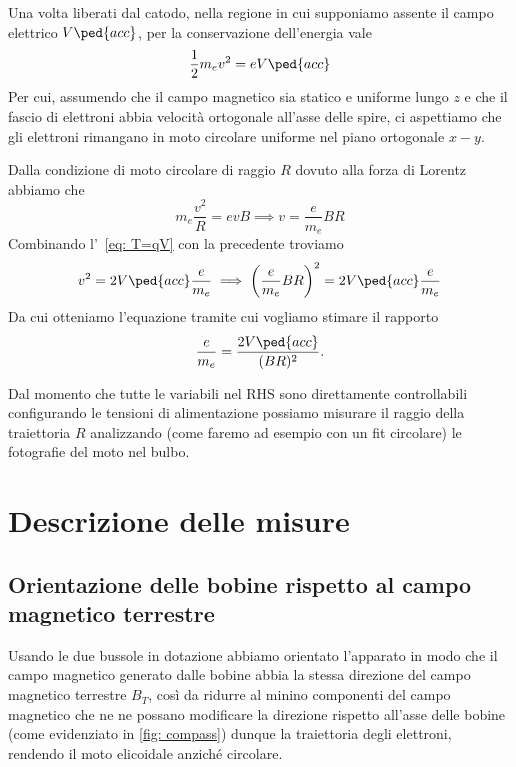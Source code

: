 \documentclass[10pt, a4paper, italian]{article}
\begin{document}
Una volta liberati dal catodo, nella regione in cui supponiamo assente il
campo elettrico $V\ped{acc}$, per la conservazione dell'energia vale
\begin{equation}\label{eq: T=qV}
    \frac{1}{2} m_{e} v^{2} = e V\ped{acc}
\end{equation}
Per cui, assumendo che il campo magnetico sia statico e uniforme lungo $z$ e
che il fascio di elettroni abbia velocità ortogonale all'asse delle spire,
ci aspettiamo che gli elettroni rimangano in moto circolare uniforme nel
piano ortogonale $x-y$.

Dalla condizione di moto circolare di raggio $R$ dovuto alla forza di Lorentz
abbiamo che
\[
m_{e} \frac{v^2}{R} = e v B \implies v = \frac{e}{m_e} B R
\]
Combinando l'~\cref{eq: T=qV} con la precedente troviamo
\[
v^2 = 2 V\ped{acc} \frac{e}{m_e} \implies \left(\frac{e}{m_e} B R\right)^2 =
2 V\ped{acc} \frac{e}{m_e}
\]
Da cui otteniamo l'equazione tramite cui vogliamo stimare il rapporto
\begin{equation}\label{eq: fit}
\frac{e}{m_{e}} = \frac{2 V\ped{acc}}{(BR)^2}.
\end{equation}

Dal momento che tutte le variabili nel RHS sono direttamente controllabili
configurando le tensioni di alimentazione possiamo misurare il raggio
della traiettoria $R$ analizzando (come faremo ad esempio con un fit
circolare) le fotografie del moto nel bulbo.

\section{Descrizione delle misure}
\subsection{Orientazione delle bobine rispetto al campo magnetico terrestre}
Usando le due bussole in dotazione abbiamo orientato l'apparato in modo che
il campo magnetico generato dalle bobine abbia la stessa direzione del campo
magnetico terrestre $B_T$, così da ridurre al minino componenti del campo
magnetico che ne ne possano modificare la direzione rispetto all'asse delle
bobine (come evidenziato in \cref{fig: compass}) dunque la traiettoria degli
elettroni, rendendo il moto elicoidale anziché circolare.
\end{document}
